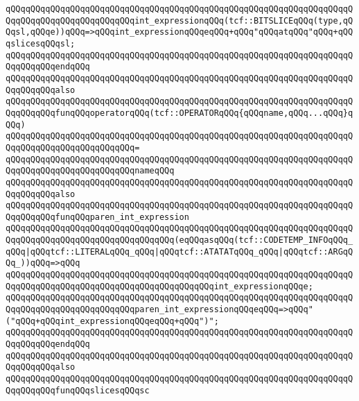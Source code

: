\verb|qQQqqQQqqQQqqQQqqQQqqQQqqQQqqQQqqQQqqQQqqQQqqQQqqQQqqQQqqQQqqQQqqQQqqQQqqQQqqQQqqQQqqQQqqQQqqQQqint_expressionqQQq(tcf::BITSLICEqQQq(type,qQQqsl,qQQqe))qQQq=>qQQqint_expressionqQQqeqQQq+qQQq"qQQqatqQQq"qQQq+qQQqslicesqQQqsl;|\newline
\verb|qQQqqQQqqQQqqQQqqQQqqQQqqQQqqQQqqQQqqQQqqQQqqQQqqQQqqQQqqQQqqQQqqQQqqQQqqQQqqQQqendqQQq|\newline
\newline
\verb|qQQqqQQqqQQqqQQqqQQqqQQqqQQqqQQqqQQqqQQqqQQqqQQqqQQqqQQqqQQqqQQqqQQqqQQqqQQqqQQqalso|\newline
\verb|qQQqqQQqqQQqqQQqqQQqqQQqqQQqqQQqqQQqqQQqqQQqqQQqqQQqqQQqqQQqqQQqqQQqqQQqqQQqqQQqfunqQQqoperatorqQQq(tcf::OPERATORqQQq{qQQqname,qQQq...qQQq}qQQq)|\newline
\verb|qQQqqQQqqQQqqQQqqQQqqQQqqQQqqQQqqQQqqQQqqQQqqQQqqQQqqQQqqQQqqQQqqQQqqQQqqQQqqQQqqQQqqQQqqQQqqQQq=|\newline
\verb|qQQqqQQqqQQqqQQqqQQqqQQqqQQqqQQqqQQqqQQqqQQqqQQqqQQqqQQqqQQqqQQqqQQqqQQqqQQqqQQqqQQqqQQqqQQqqQQqnameqQQq|\newline
\newline
\verb|qQQqqQQqqQQqqQQqqQQqqQQqqQQqqQQqqQQqqQQqqQQqqQQqqQQqqQQqqQQqqQQqqQQqqQQqqQQqqQQqalso|\newline
\verb|qQQqqQQqqQQqqQQqqQQqqQQqqQQqqQQqqQQqqQQqqQQqqQQqqQQqqQQqqQQqqQQqqQQqqQQqqQQqqQQqfunqQQqparen_int_expression|\newline
\verb|qQQqqQQqqQQqqQQqqQQqqQQqqQQqqQQqqQQqqQQqqQQqqQQqqQQqqQQqqQQqqQQqqQQqqQQqqQQqqQQqqQQqqQQqqQQqqQQqqQQqqQQq(eqQQqasqQQq(tcf::CODETEMP_INFOqQQq_qQQq|\verb#|qQQqtcf::LITERALqQQq_qQQq|qQQqtcf::ATATATqQQq_qQQq|qQQqtcf::ARGqQQq_))qQQq=>qQQq#\newline
\verb|qQQqqQQqqQQqqQQqqQQqqQQqqQQqqQQqqQQqqQQqqQQqqQQqqQQqqQQqqQQqqQQqqQQqqQQqqQQqqQQqqQQqqQQqqQQqqQQqqQQqqQQqqQQqqQQqint_expressionqQQqe;|\newline
\verb|qQQqqQQqqQQqqQQqqQQqqQQqqQQqqQQqqQQqqQQqqQQqqQQqqQQqqQQqqQQqqQQqqQQqqQQqqQQqqQQqqQQqqQQqqQQqqQQqparen_int_expressionqQQqeqQQq=>qQQq"("qQQq+qQQqint_expressionqQQqeqQQq+qQQq")";|\newline
\verb|qQQqqQQqqQQqqQQqqQQqqQQqqQQqqQQqqQQqqQQqqQQqqQQqqQQqqQQqqQQqqQQqqQQqqQQqqQQqqQQqendqQQq|\newline
\newline
\verb|qQQqqQQqqQQqqQQqqQQqqQQqqQQqqQQqqQQqqQQqqQQqqQQqqQQqqQQqqQQqqQQqqQQqqQQqqQQqqQQqalso|\newline
\verb|qQQqqQQqqQQqqQQqqQQqqQQqqQQqqQQqqQQqqQQqqQQqqQQqqQQqqQQqqQQqqQQqqQQqqQQqqQQqqQQqfunqQQqslicesqQQqsc|\newline
